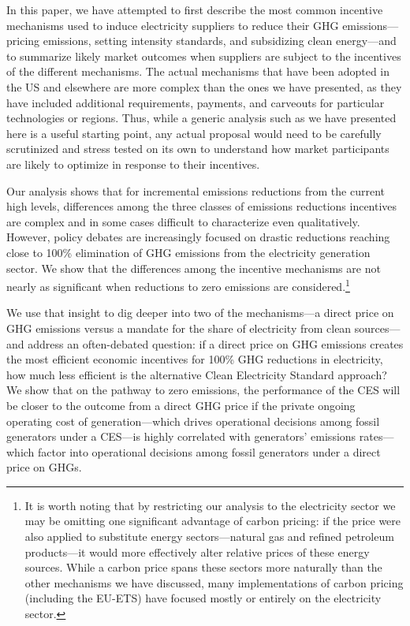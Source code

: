 \documentclass[12pt]{article}
\begin{document}
In this paper, we have attempted to first describe the most common incentive mechanisms used to induce electricity  suppliers to reduce their GHG emissions---pricing emissions, setting intensity standards, and subsidizing clean energy---and to summarize likely market outcomes when suppliers are subject to the incentives of the different mechanisms.  The actual mechanisms that have been adopted in the US and elsewhere are more complex than the ones we have presented, as they have included additional requirements, payments, and carveouts for particular technologies or regions. Thus, while a generic analysis such as we have presented here is a useful starting point, any actual proposal would need to be carefully scrutinized and stress tested on its own to understand how market participants are likely to optimize in response to their incentives.

Our analysis shows that for incremental emissions reductions from the current high levels, differences among the three classes of emissions reductions incentives are complex and in some cases difficult to characterize even qualitatively. However, policy debates are increasingly focused on drastic reductions reaching close to 100\% elimination of GHG emissions from the electricity generation sector. We show that the differences among the incentive mechanisms are not nearly as significant when reductions to zero emissions are considered.\footnote{It is worth noting that by restricting our analysis to the electricity sector we may be omitting one significant advantage of carbon pricing: if the price were also applied to substitute energy sectors---natural gas and refined petroleum products---it would more effectively alter relative prices of these energy sources. While a carbon price spans these sectors more naturally than the other mechanisms we have discussed, many implementations of carbon pricing (including the EU-ETS) have focused mostly or entirely on the electricity sector.}

We use that insight to dig deeper into two of the mechanisms---a direct price on GHG emissions versus a mandate for the share of electricity from clean sources---and address an often-debated question: if a direct price on GHG emissions creates the most efficient economic incentives for 100\% GHG reductions in electricity, how much less efficient is the alternative Clean Electricity Standard approach?  We show that on the pathway to zero emissions, the performance of the CES will be closer to the outcome from a direct GHG price if the private ongoing operating cost of generation---which drives operational decisions among fossil generators under a CES---is highly correlated with generators' emissions rates---which factor into operational decisions among fossil generators under a direct price on GHGs. 
\end{document}

